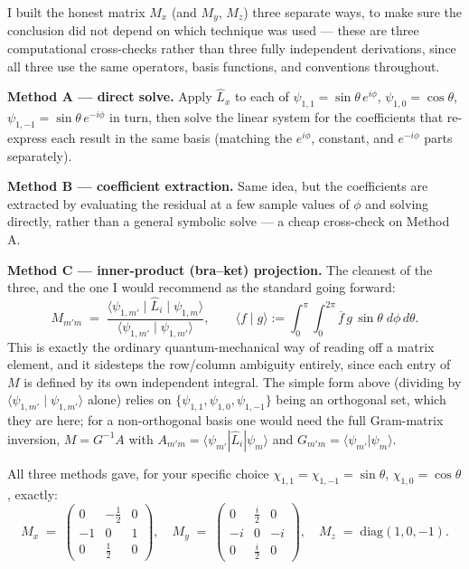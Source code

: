 \documentclass[11pt]{article}
\begin{document}
I built the honest matrix $M_x$ (and $M_y$, $M_z$) three separate ways, to
make sure the conclusion did not depend on which technique was used ---
these are three computational cross-checks rather than three fully
independent derivations, since all three use the same operators, basis
functions, and conventions throughout.

\textbf{Method A --- direct solve.} Apply $\hat L_x$ to each of
$\psi_{1,1}=\sin\theta\,e^{i\phi}$, $\psi_{1,0}=\cos\theta$,
$\psi_{1,-1}=\sin\theta\,e^{-i\phi}$ in turn, then solve the linear system
for the coefficients that re-express each result in the same basis
(matching the $e^{i\phi}$, constant, and $e^{-i\phi}$ parts separately).

\textbf{Method B --- coefficient extraction.} Same idea, but the
coefficients are extracted by evaluating the residual at a few sample
values of $\phi$ and solving directly, rather than a general symbolic
solve --- a cheap cross-check on Method A.

\textbf{Method C --- inner-product (bra--ket) projection.} The cleanest of
the three, and the one I would recommend as the standard going forward:
\[
  M_{m'm} \;=\; \frac{\langle \psi_{1,m'} \mid \hat L_i \mid \psi_{1,m}\rangle}
                     {\langle \psi_{1,m'} \mid \psi_{1,m'}\rangle},
  \qquad
  \langle f \mid g\rangle := \int_0^\pi\!\!\int_0^{2\pi} \overline{f}\,g\,\sin\theta\;d\phi\,d\theta .
\]
This is exactly the ordinary quantum-mechanical way of reading off a
matrix element, and it sidesteps the row/column ambiguity entirely, since
each entry of $M$ is defined by its own independent integral. The simple
form above (dividing by $\langle\psi_{1,m'}\mid\psi_{1,m'}\rangle$ alone)
relies on $\{\psi_{1,1},\psi_{1,0},\psi_{1,-1}\}$ being an orthogonal set,
which they are here; for a non-orthogonal basis one would need the full
Gram-matrix inversion, $M=G^{-1}A$ with $A_{m'm}=\langle\psi_{m'}|\hat
L_i|\psi_m\rangle$ and $G_{m'm}=\langle\psi_{m'}|\psi_m\rangle$.

All three methods gave, for your specific choice
$\chi_{1,1}=\chi_{1,-1}=\sin\theta$, $\chi_{1,0}=\cos\theta$, exactly:
\[
  M_x \;=\; \begin{pmatrix} 0 & -\tfrac12 & 0 \\ -1 & 0 & 1 \\ 0 & \tfrac12 & 0\end{pmatrix},
  \quad
  M_y \;=\; \begin{pmatrix} 0 & \tfrac{i}{2} & 0 \\ -i & 0 & -i \\ 0 & \tfrac{i}{2} & 0\end{pmatrix},
  \quad
  M_z \;=\; \mathrm{diag}(1,0,-1).
\]
\end{document}
